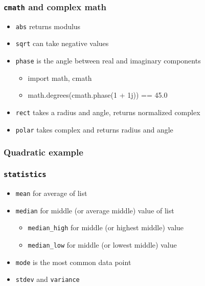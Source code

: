 \documentclass{beamer}
\begin{document}
\begin{frame}
  \frametitle{\texttt{cmath} and complex math}

  \begin{itemize}
    \item \texttt{abs} returns modulus
    \item \texttt{sqrt} can take negative values
    \item \texttt{phase} is the angle between real and imaginary components
      \begin{itemize}
        \item import math, cmath
	\item math.degrees(cmath.phase(1 + 1j)) == 45.0
      \end{itemize}
    \item \texttt{rect} takes a radius and angle, returns normalized complex
    \item \texttt{polar} takes complex and returns radius and angle
  \end{itemize}
\end{frame}

\begin{frame}
  \frametitle{Quadratic example}
\end{frame}

\begin{frame}
  \frametitle{\texttt{statistics}}

  \begin{itemize}
    \item \texttt{mean} for average of list
    \item \texttt{median} for middle (or average middle) value of list
    \begin{itemize}
      \item \texttt{median\_high} for middle (or highest middle) value
      \item \texttt{median\_low} for middle (or lowest middle) value
     \end{itemize}
    \item \texttt{mode} is the most common data point
    \item \texttt{stdev} and \texttt{variance} 
  \end{itemize}
\end{frame}
\end{document}
